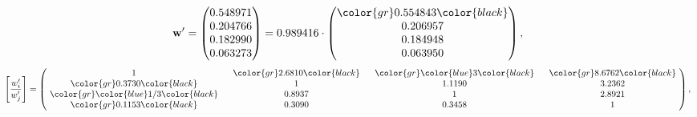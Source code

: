 \begin{example}
\begin{equation*}
\mathbf{w}^{\prime} =
\begin{pmatrix}
0.548971\\
0.204766\\
0.182990\\
0.063273
\end{pmatrix} =
0.989416\cdot
\begin{pmatrix}
\color{gr} 0.554843\color{black} \\
0.206957\\
0.184948\\
0.063950
\end{pmatrix},
\end{equation*}
\begin{equation*}
\left[ \frac{{w}^{\prime}_i}{{w}^{\prime}_j} \right] =
\begin{pmatrix}
$\,\,$ 1 $\,\,$ & $\,\,$\color{gr} 2.6810\color{black} $\,\,$ & $\,\,$\color{gr} \color{blue} 3\color{black} $\,\,$ & $\,\,$\color{gr} 8.6762\color{black} $\,\,$ \\
$\,\,$\color{gr} 0.3730\color{black} $\,\,$ & $\,\,$ 1 $\,\,$ & $\,\,$1.1190$\,\,$ & $\,\,$3.2362  $\,\,$ \\
$\,\,$\color{gr} \color{blue}  1/3\color{black} $\,\,$ & $\,\,$0.8937$\,\,$ & $\,\,$ 1 $\,\,$ & $\,\,$2.8921 $\,\,$ \\
$\,\,$\color{gr} 0.1153\color{black} $\,\,$ & $\,\,$0.3090$\,\,$ & $\,\,$0.3458$\,\,$ & $\,\,$ 1  $\,\,$ \\
\end{pmatrix},
\end{equation*}
\end{example}
\newpage
